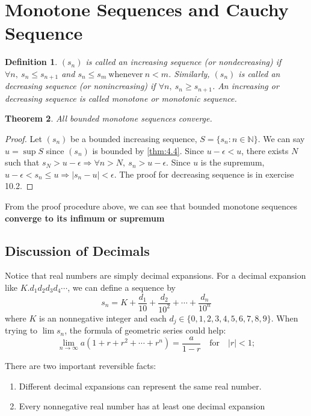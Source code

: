 \documentclass[12pt, lettersize]{book}
\newtheorem{thm}{Theorem}[section]
\newtheorem{dfn}[thm]{Definition}
\begin{document}
		\newpage
	\section{Monotone Sequences and Cauchy Sequence}
		\begin{dfn}
		$(s_n)$ is called an \emph{increasing sequence (or nondecreasing)} if $\forall n,\ s_n\leq s_{n+1}$ and $s_n\leq s_m\ \text{whenever}\ n<m$.
		Similarly, $(s_n)$ is called an \emph{decreasing sequence (or nonincreasing)} if $\forall n,\ s_n\geq s_{n+1}$. An increasing or decreasing sequence is called \emph{monotone} or \emph{monotonic} sequence.
		\end{dfn}
	
		\begin{thm}\label{def:bounded monotone seq}
		All bounded monotone sequences converge.
		\end{thm}
		\begin{proof}
		Let $(s_n)$ be a bounded increasing sequence, $S=\{s_n: n\in \mathbb{N}\}$. We can say $u=\sup S$ since $(s_n)$ is bounded by \ref{thm:4.4}. 
		Since $u-\epsilon<u$, there exists $N$ such that $s_N>u-\epsilon \Rightarrow \forall n>N,\ s_n>u-\epsilon$. Since $u$ is the supremum, $u-\epsilon<s_n\leq u \Rightarrow |s_n-u|<\epsilon$.
		The proof for decreasing sequence is in exercise 10.2.
		\end{proof}
		
		From the proof procedure above, we can see that bounded monotone sequences \textbf{converge to its infimum or supremum}
		
		\subsection*{Discussion of Decimals}
		Notice that real numbers are simply decimal expansions. For a decimal expansion like $K.d_1d_2d_3d_4\cdots$, we can define a sequence by
		\begin{displaymath}
			s_n=K+\frac{d_1}{10}+\frac{d_2}{10^2}+\cdots+\frac{d_n}{10^n}
		\end{displaymath} 
		where $K$ is an nonnegative integer and each $d_j\in\{0,1,2,3,4,5,6,7,8,9\}$. When trying to $\lim s_n$, the formula
		of geometric series could help:
		\begin{displaymath}
			\lim\limits_{n\rightarrow\infty}a(1+r+r^2+\cdots+r^n)=\frac{a}{1-r}\quad \text{for}\quad |r|<1;
		\end{displaymath}
		
		There are two important reversible facts:
		\begin{enumerate}
			\item Different decimal expansions can represent the same real number.
			\item Every nonnegative real number has at least one decimal expansion
		\end{enumerate}
\end{document}
